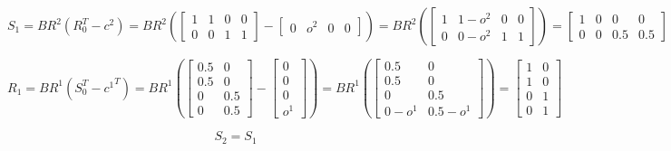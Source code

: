 \documentclass[10]{article}
\begin{document}
\begin{equation*}
S_1=
BR^2(R_0^T-c^2)=
BR^2(
\begin{bmatrix}
1 & 1 & 0 & 0\\
0 & 0 & 1 & 1
\end{bmatrix}
-
\begin{bmatrix}
0 & o^2 & 0 & 0
\end{bmatrix}
)
=
BR^2(
\begin{bmatrix}
 1      & 1-o^2   & 0  & 0   \\
0     & 0-o^2   & 1      & 1 
\end{bmatrix}
)
=
\begin{bmatrix}
1 & 0 & 0 & 0\\
0 & 0 & 0.5 & 0.5
\end{bmatrix}
\end{equation*}

\begin{equation*}
R_1=
BR^1(S_0^T-{c^1}^T)=
BR^1(
\begin{bmatrix}
0.5 & 0\\
0.5 & 0\\
0 & 0.5\\
0 & 0.5
\end{bmatrix}
-
\begin{bmatrix}
0 \\
0 \\
0 \\
o^1
\end{bmatrix}
)
=
BR^1(
\begin{bmatrix}
0.5 & 0\\
0.5 & 0\\
0 & 0.5\\
0-o^1 & 0.5-o^1
\end{bmatrix}
)
=
\begin{bmatrix}
1 & 0\\
1 & 0\\
0 & 1\\
0 & 1
\end{bmatrix}
\end{equation*}

\begin{equation*}
S_2=S_1
\end{equation*}
\end{document}
